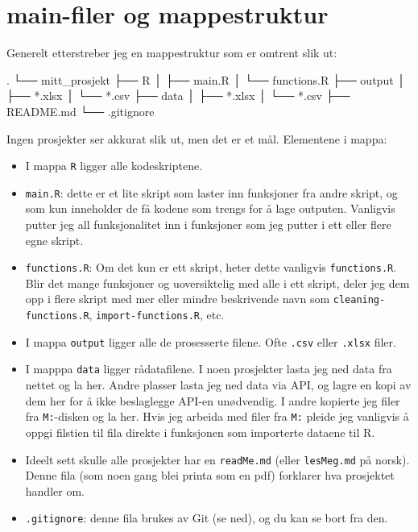 \documentclass[
  letterpaper,
  DIV=11,
  numbers=noendperiod]{scrreprt}
\newenvironment{Shaded}{\begin{snugshade}}{\end{snugshade}}
\newcommand{\NormalTok}[1]{\textcolor[rgb]{0.00,0.23,0.31}{#1}}
\newcommand{\SpecialCharTok}[1]{\textcolor[rgb]{0.37,0.37,0.37}{#1}}
\providecommand{\tightlist}{%
  \setlength{\itemsep}{0pt}\setlength{\parskip}{0pt}}\usepackage{longtable,booktabs,array}
\begin{document}
\hypertarget{main-filer-og-mappestruktur}{%
\section{main-filer og
mappestruktur}\label{main-filer-og-mappestruktur}}

Generelt etterstreber jeg en mappestruktur som er omtrent slik ut:

\begin{Shaded}
\begin{Highlighting}[]
\NormalTok{.}
\NormalTok{└── mitt\_prosjekt}
\NormalTok{    ├── R}
\NormalTok{    │   ├── main.R}
\NormalTok{    │   └── functions.R}
\NormalTok{    ├── output}
\NormalTok{    │   ├── }\SpecialCharTok{*}\NormalTok{.xlsx}
\NormalTok{    │   └── }\SpecialCharTok{*}\NormalTok{.csv}
\NormalTok{    ├── data}
\NormalTok{    │   ├── }\SpecialCharTok{*}\NormalTok{.xlsx}
\NormalTok{    │   └── }\SpecialCharTok{*}\NormalTok{.csv}
\NormalTok{    ├── README.md}
\NormalTok{    └── .gitignore}
\end{Highlighting}
\end{Shaded}

Ingen prosjekter ser akkurat slik ut, men det er et mål. Elementene i
mappa:

\begin{itemize}
\tightlist
\item
  I mappa \texttt{R} ligger alle kodeskriptene.
\item
  \texttt{main.R}: dette er et lite skript som laster inn funksjoner fra
  andre skript, og som kun inneholder de få kodene som trengs for å lage
  outputen. Vanligvis putter jeg all funksjonalitet inn i funksjoner som
  jeg putter i ett eller flere egne skript.
\item
  \texttt{functions.R}: Om det kun er ett skript, heter dette vanligvis
  \texttt{functions.R}. Blir det mange funksjoner og uoversiktelig med
  alle i ett skript, deler jeg dem opp i flere skript med mer eller
  mindre beskrivende navn som \texttt{cleaning-functions.R},
  \texttt{import-functions.R}, etc.
\item
  I mappa \texttt{output} ligger alle de prosesserte filene. Ofte
  \texttt{.csv} eller \texttt{.xlsx} filer.
\item
  I mapppa \texttt{data} ligger rådatafilene. I noen prosjekter lasta
  jeg ned data fra nettet og la her. Andre plasser lasta jeg ned data
  via API, og lagre en kopi av dem her for å ikke beslaglegge API-en
  unødvendig. I andre kopierte jeg filer fra \texttt{M:}-disken og la
  her. Hvis jeg arbeida med filer fra \texttt{M:} pleide jeg vanligvis å
  oppgi filstien til fila direkte i funksjonen som importerte dataene
  til R.
\item
  Ideelt sett skulle alle prosjekter har en \texttt{readMe.md} (eller
  \texttt{lesMeg.md} på norsk). Denne fila (som noen gang blei printa
  som en pdf) forklarer hva prosjektet handler om.
\item
  \texttt{.gitignore}: denne fila brukes av Git (se ned), og du kan se
  bort fra den.
\end{itemize}
\end{document}
